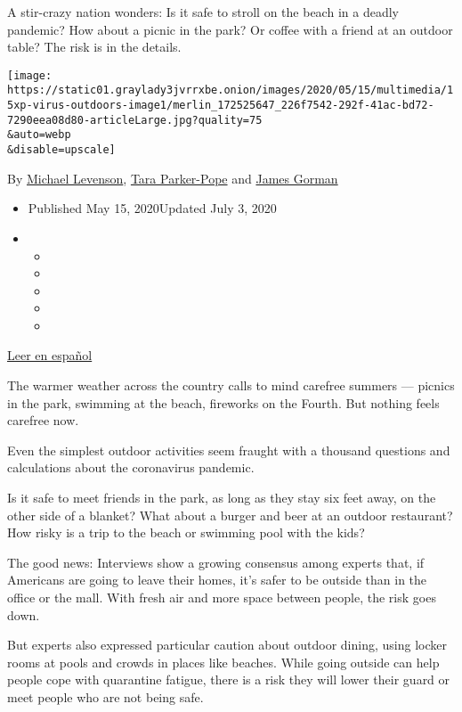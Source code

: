A stir-crazy nation wonders: Is it safe to stroll on the beach in a
deadly pandemic? How about a picnic in the park? Or coffee with a friend
at an outdoor table? The risk is in the details.

\texttt{[image: https://static01.graylady3jvrrxbe.onion/images/2020/05/15/multimedia/15xp-virus-outdoors-image1/merlin\_172525647\_226f7542-292f-41ac-bd72-7290eea08d80-articleLarge.jpg?quality=75\\\&auto=webp\\\&disable=upscale]}

By \href{https://www.nytimes3xbfgragh.onion/by/michael-levenson}{Michael
Levenson},
\href{https://www.nytimes3xbfgragh.onion/by/tara-parker-pope}{Tara
Parker-Pope} and
\href{https://www.nytimes3xbfgragh.onion/by/james-gorman}{James Gorman}

\begin{itemize}
\item
  Published May 15, 2020Updated July 3, 2020
\item
  \begin{itemize}
  \item
  \item
  \item
  \item
  \item
  \end{itemize}
\end{itemize}

\href{https://www.nytimes3xbfgragh.onion/es/2020/05/19/espanol/coronavirus-que-hacer-afuera.html}{Leer
en español}

The warmer weather across the country calls to mind carefree summers ---
picnics in the park, swimming at the beach, fireworks on the Fourth. But
nothing feels carefree now.

Even the simplest outdoor activities seem fraught with a thousand
questions and calculations about the coronavirus pandemic.

Is it safe to meet friends in the park, as long as they stay six feet
away, on the other side of a blanket? What about a burger and beer at an
outdoor restaurant? How risky is a trip to the beach or swimming pool
with the kids?

The good news: Interviews show a growing consensus among experts that,
if Americans are going to leave their homes, it's safer to be outside
than in the office or the mall. With fresh air and more space between
people, the risk goes down.

But experts also expressed particular caution about outdoor dining,
using locker rooms at pools and crowds in places like beaches. While
going outside can help people cope with quarantine fatigue, there is a
risk they will lower their guard or meet people who are not being safe.

